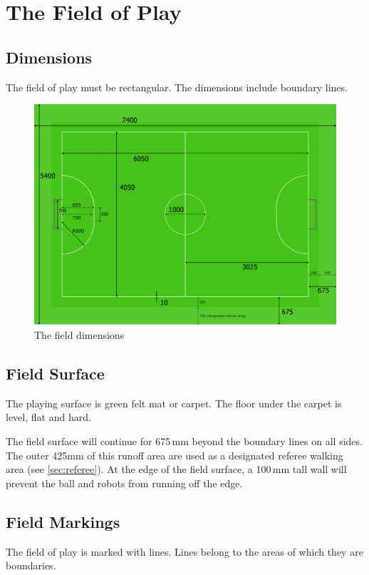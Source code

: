 \section{The Field of Play}\label{sec:field-of-play}

\subsection{Dimensions}
The field of play must be rectangular.
The dimensions include boundary lines.



\begin{figure}[ht] %
	\centering
	\includegraphics[width=0.8\columnwidth]{img/field_2012_drawing.png}
	\caption{The field dimensions}
	\label{fig:sslfield}
\end{figure}

\subsection{Field Surface}
The playing surface is green felt mat or carpet.
The floor under the carpet is level, flat\added{,} and hard.

The field surface will continue for 675\,mm beyond the boundary lines on all sides.
The outer 425\added{\,}mm of this runoff area are used as a designated referee walking area (see \autoref{sec:referee}).
At the edge of the field surface, a 100\,mm tall wall will prevent the ball and robots from running off the edge.

\subsection{Field Markings}
The field of play is marked with lines.
Lines belong to the areas of which they are boundaries.

